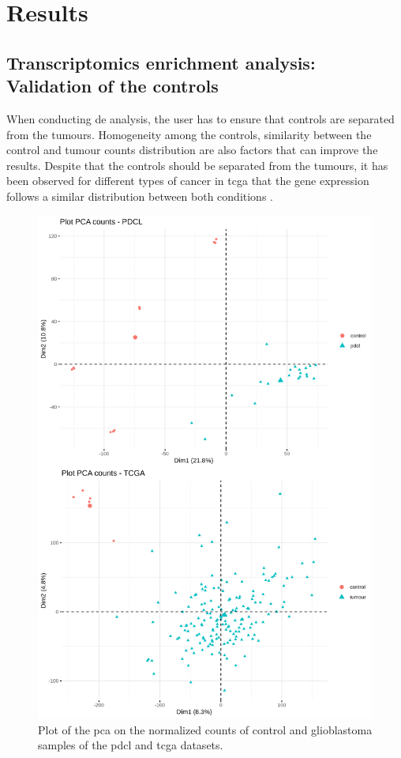 \section{Results}

\subsection{Transcriptomics enrichment analysis: Validation of the controls}

When conducting \acrlong{de} analysis, the user has to ensure that controls are separated from the tumours.
Homogeneity among the controls, similarity between the control and tumour counts distribution are also factors that can improve the results.
Despite that the controls should be separated from the tumours, it has been observed for different types of cancer in \acrshort{tcga} that the gene expression follows a similar distribution between both conditions \cite*{Decamps2021}.

\begin{figure}
    \begin{center}
        \includegraphics[height=0.8\textheight]{img/pca_plot}
        \caption{
            Plot of the \acrshort{pca} on the normalized counts of control and glioblastoma samples of the \acrshort{pdcl} and \acrshort{tcga} datasets.
        }
        \label{fig:pca-plot}
    \end{center}
\end{figure}

